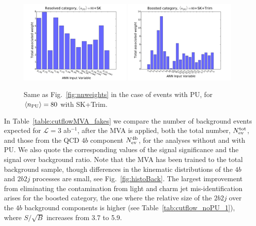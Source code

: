 \begin{figure}[t]
\begin{center}
\includegraphics[width=0.49\textwidth]{plots/res_wgthist_SKPU80.pdf}
\includegraphics[width=0.49\textwidth]{plots/bst_wgthist_SKPU80.pdf}
\vspace{-0.5cm}
\caption{\small
Same as Fig.~\ref{fig:nnweights} in the
case of events with PU, for
$\left\langle n_{\rm PU}\right\rangle=80$ with SK+Trim.
}
\label{fig:nnweights_PU}
\end{center}
\end{figure}


In Table~\ref{table:cutflowMVA_fakes} we compare
the  number of background events  expected for
$\mathcal{L}=3$ ab$^{-1}$,
after the MVA is applied, both
the total number, $N_{\rm ev}^{\rm tot}$,
and those from the  QCD $4b$ component
$N_{\rm ev}^{\rm 4b}$, for the analyses without and
with PU.
%
 We also quote the corresponding values of the signal 
    significance and the signal over background ratio.
    Note that the MVA has been trained to the total background sample,
    though differences
    in the kinematic distributions of the $4b$ and $2b2j$ processes are small,
    see Fig.~\ref{fig:histoBack}.
    The largest improvement from eliminating the contamination
    from light and charm jet mis-identification arises
    for the boosted category, the one where the relative size of the
    $2b2j$ over the $4b$ background components is higher
    (see Table~\ref{tab:cutflow_noPU_1}), where
    $S/\sqrt{B}$ increases from 3.7 to 5.9.
%

